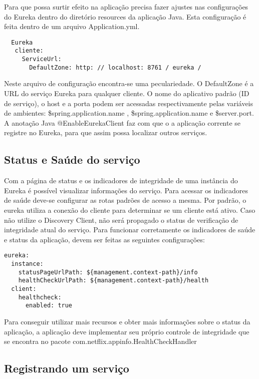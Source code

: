 Para que possa surtir efeito na aplicação precisa fazer ajustes nas configurações do Eureka dentro do diretório resources da aplicação Java. Esta configuração é feita dentro de um arquivo Application.yml.

\begin{verbatim}
  Eureka
   cliente:
     ServiceUrl:
       DefaultZone: http: // localhost: 8761 / eureka / 
\end{verbatim}

Neste arquivo de configuração encontra-se uma peculariedade. O DefaultZone é a URL do serviço Eureka para qualquer cliente. O nome do aplicativo padrão (ID de serviço), o host e a porta podem ser acessadas respectivamente pelas variáveis de ambientes: \${spring.application.name} , \${spring.application.name} e \${server.port}.
A anotação Java @EnableEurekaClient faz com que o a aplicação corrente se registre no Eureka, para que assim possa localizar outros serviços.

\subsection{Status e Saúde do serviço}

Com a página de status e os indicadores de integridade de uma instância do Eureka é possível visualizar informações do serviço. Para acessar os indicadores de saúde deve-se configurar as rotas padrões de acesso a mesma. Por padrão, o eureka utiliza a conexão do cliente para determinar se um cliente está ativo. Caso não utilize o Discovery Client, não será propagado o status de verificação de integridade atual do serviço. Para funcionar corretamente os indicadores de saúde e status da aplicação, devem ser feitas as seguintes configurações:

\begin{verbatim}
eureka:
  instance:
    statusPageUrlPath: ${management.context-path}/info
    healthCheckUrlPath: ${management.context-path}/health
  client:
    healthcheck:
      enabled: true
\end{verbatim}

Para conseguir utilizar mais recursos e obter mais informações sobre o status da aplicação, a aplicação deve implementar seu próprio controle de integridade que se encontra no pacote com.netflix.appinfo.HealthCheckHandler

\subsection{Registrando um serviço}

